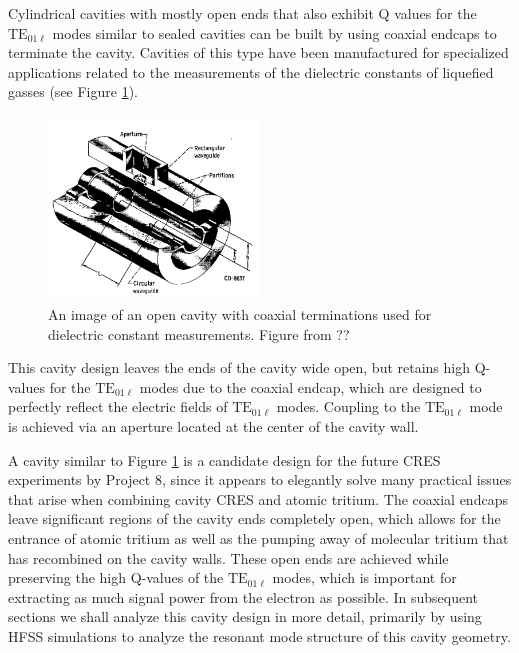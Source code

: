 Cylindrical cavities with mostly open ends that also exhibit Q values for the $\mathrm{TE}_{01\ell}$ modes similar to sealed cavities can be built by using coaxial endcaps to terminate the cavity. Cavities of this type have been manufactured for specialized applications related to the measurements of the dielectric constants of liquefied gasses (see Figure \ref{fig:chap6-open-cavity-image}).
\begin{figure}[htbp]
    \centering
    \includegraphics*[width=0.5\textwidth]{figs/Chapter-6/230606_open_cavity_image.png}
    \caption{\label{fig:chap6-open-cavity-image} An image of an open cavity with coaxial terminations used for dielectric constant measurements. Figure from ??}
\end{figure}
This cavity design leaves the ends of the cavity wide open, but retains high Q-values for the $\mathrm{TE}_{01\ell}$ modes due to the coaxial endcap, which are designed to perfectly reflect the electric fields of $\mathrm{TE}_{01\ell}$ modes. Coupling to the $\mathrm{TE_{01\ell}}$ mode is achieved via an aperture located at the center of the cavity wall. 

A cavity similar to Figure \ref{fig:chap6-open-cavity-image} is a candidate design for the future CRES experiments by Project 8, since it appears to elegantly solve many practical issues that arise when combining cavity CRES and atomic tritium. The coaxial endcaps leave significant regions of the cavity ends completely open, which allows for the entrance of atomic tritium as well as the pumping away of molecular tritium that has recombined on the cavity walls. These open ends are achieved while preserving the high Q-values of the $\mathrm{TE}_{01\ell}$ modes, which is important for extracting as much signal power from the electron as possible. In subsequent sections we shall analyze this cavity design in more detail, primarily by using HFSS simulations to analyze the resonant mode structure of this cavity geometry.


